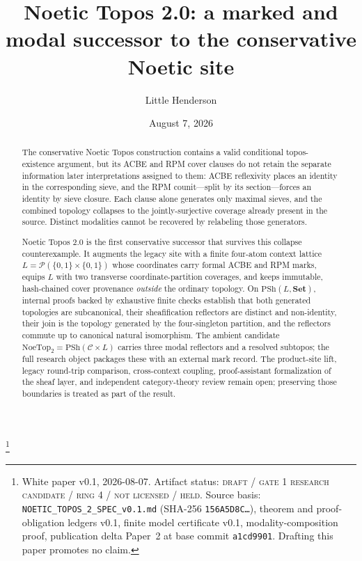 \documentclass[11pt]{amsart}
\theoremstyle{definition}
\theoremstyle{remark}
\newcommand{\PSh}{\mathrm{PSh}}
\newcommand{\Set}{\mathbf{Set}}
\begin{document}
\title[The marked and modal Noetic topos]{Noetic Topos 2.0: a marked and modal successor to the conservative Noetic site}
\author{Little Henderson}
\thanks{White paper v0.1, 2026-08-07. Artifact status: \textsc{draft / gate 1 research candidate / ring 4 / not licensed / held}. Source basis: \texttt{NOETIC\_TOPOS\_2\_SPEC\_v0.1.md} (SHA-256 \texttt{156A5D8C\ldots}), theorem and proof-obligation ledgers v0.1, finite model certificate v0.1, modality-composition proof, publication delta Paper~2 at base commit \texttt{a1cd9901}. Drafting this paper promotes no claim.}
\date{August 7, 2026}

\begin{abstract}
The conservative Noetic Topos construction contains a valid conditional topos-existence argument, but its ACBE and RPM cover clauses do not retain the separate information later interpretations assigned to them: ACBE reflexivity places an identity in the corresponding sieve, and the RPM counit---split by its section---forces an identity by sieve closure. Each clause alone generates only maximal sieves, and the combined topology collapses to the jointly-surjective coverage already present in the source. Distinct modalities cannot be recovered by relabeling those generators.

Noetic Topos 2.0 is the first conservative successor that survives this collapse counterexample. It augments the legacy site with a finite four-atom context lattice $L=\mathcal{P}(\{0,1\}\times\{0,1\})$ whose coordinates carry formal ACBE and RPM marks, equips $L$ with two transverse coordinate-partition coverages, and keeps immutable, hash-chained cover provenance \emph{outside} the ordinary topology. On $\PSh(L,\Set)$, internal proofs backed by exhaustive finite checks establish that both generated topologies are subcanonical, their sheafification reflectors are distinct and non-identity, their join is the topology generated by the four-singleton partition, and the reflectors commute up to canonical natural isomorphism. The ambient candidate $\mathrm{NoeTop}_2=\PSh(\mathcal{C}\times L)$ carries three modal reflectors and a resolved subtopos; the full research object packages these with an external mark record. The product-site lift, legacy round-trip comparison, cross-context coupling, proof-assistant formalization of the sheaf layer, and independent category-theory review remain open; preserving those boundaries is treated as part of the result.
\end{abstract}

\maketitle
\end{document}
